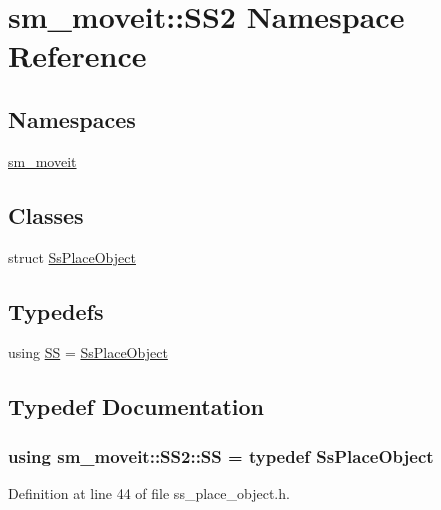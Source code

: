 \hypertarget{namespacesm__moveit_1_1SS2}{}\section{sm\+\_\+moveit\+:\+:S\+S2 Namespace Reference}
\label{namespacesm__moveit_1_1SS2}
\subsection*{Namespaces}
\begin{DoxyCompactItemize}
\item 
 \hyperlink{namespacesm__moveit_1_1SS2_1_1sm__moveit}{sm\+\_\+moveit}
\end{DoxyCompactItemize}
\subsection*{Classes}
\begin{DoxyCompactItemize}
\item 
struct \hyperlink{structsm__moveit_1_1SS2_1_1SsPlaceObject}{Ss\+Place\+Object}
\end{DoxyCompactItemize}
\subsection*{Typedefs}
\begin{DoxyCompactItemize}
\item 
using \hyperlink{namespacesm__moveit_1_1SS2_af2aad268be87b0f3360fd87ba135d957}{SS} = \hyperlink{structsm__moveit_1_1SS2_1_1SsPlaceObject}{Ss\+Place\+Object}
\end{DoxyCompactItemize}


\subsection{Typedef Documentation}
\subsubsection[{\texorpdfstring{SS}{SS}}]{\setlength{\rightskip}{0pt plus 5cm}using {\bf sm\+\_\+moveit\+::\+S\+S2\+::\+SS} = typedef {\bf Ss\+Place\+Object}}\hypertarget{namespacesm__moveit_1_1SS2_af2aad268be87b0f3360fd87ba135d957}{}\label{namespacesm__moveit_1_1SS2_af2aad268be87b0f3360fd87ba135d957}


Definition at line 44 of file ss\+\_\+place\+\_\+object.\+h.

